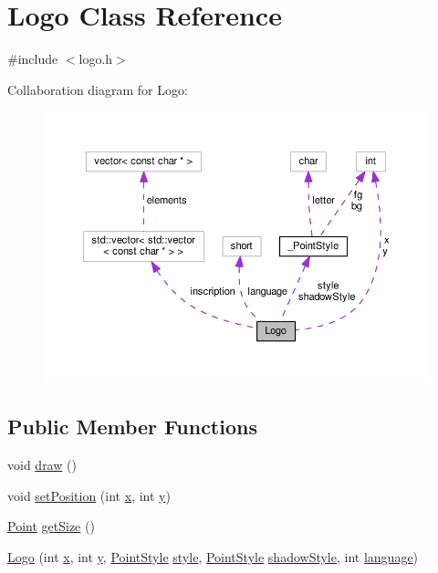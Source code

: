 \hypertarget{class_logo}{\section{Logo Class Reference}
\label{class_logo}
}


{\ttfamily \#include $<$logo.\-h$>$}



Collaboration diagram for Logo\-:
\nopagebreak
\begin{figure}[H]
\begin{center}
\leavevmode
\includegraphics[width=350pt]{class_logo__coll__graph}
\end{center}
\end{figure}
\subsection*{Public Member Functions}
\begin{DoxyCompactItemize}
\item 
void \hyperlink{class_logo_aced3f5817a709bcc0fd7cf8a360a2523}{draw} ()
\item 
void \hyperlink{class_logo_a048b9474c23e659c94f590509376f198}{set\-Position} (int \hyperlink{class_logo_ab25a813d9b3635c4b524dab9bc2ee86e}{x}, int \hyperlink{class_logo_a33846b1b3ac0da8180c888fb9a1680f6}{y})
\item 
\hyperlink{common_8h_aa9cfdb80b4ca12013a2de8a3b9b97981}{Point} \hyperlink{class_logo_aeeefce0ee601c896c38b929b7a355616}{get\-Size} ()
\item 
\hyperlink{class_logo_a1cdb59eff67441b73e9d0450e6a88921}{Logo} (int \hyperlink{class_logo_ab25a813d9b3635c4b524dab9bc2ee86e}{x}, int \hyperlink{class_logo_a33846b1b3ac0da8180c888fb9a1680f6}{y}, \hyperlink{common_8h_afd9cb36d6ef309c77ea1e3177e19c623}{Point\-Style} \hyperlink{class_logo_a2a0115dd4566f475c108eb3728265b62}{style}, \hyperlink{common_8h_afd9cb36d6ef309c77ea1e3177e19c623}{Point\-Style} \hyperlink{class_logo_a73d851ecd0cf3b7513f47df2aa462142}{shadow\-Style}, int \hyperlink{class_logo_ac3f13aa3fd16b904a71157e6ff47e48e}{language})
\end{DoxyCompactItemize}
